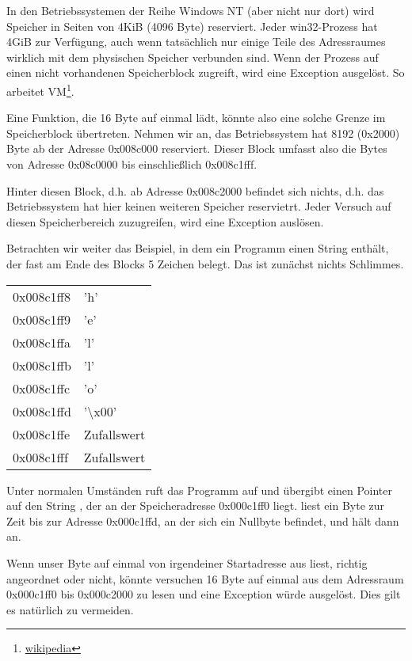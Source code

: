 \newcommand{\URLPAGE}{\href{http://go.yurichev.com/17136}{wikipedia}}
In den Betriebssystemen der Reihe \gls{Windows NT} (aber nicht nur dort) wird Speicher in Seiten von 4KiB (4096 Byte)
reserviert. Jeder win32-Prozess hat 4GiB zur Verfügung, auch wenn tatsächlich nur einige Teile des Adressraumes wirklich
mit dem physischen Speicher verbunden sind. Wenn der Prozess auf einen nicht vorhandenen Speicherblock zugreift, wird
eine Exception ausgelöst. So arbeitet \ac{VM}\footnote{\URLPAGE}.

Eine Funktion, die 16 Byte auf einmal lädt, könnte also eine solche Grenze im Speicherblock übertreten.
Nehmen wir an, das Betriebssystem hat 8192 (0x2000) Byte ab der Adresse 0x008c000 reserviert.
Dieser Block umfasst also die Bytes von Adresse 0x08c0000 bis einschließlich 0x008c1fff.

Hinter diesen Block, d.h. ab Adresse 0x008c2000 befindet sich nichts, d.h. das Betriebssystem hat hier keinen weiteren
Speicher reservietrt. Jeder Versuch auf diesen Speicherbereich zuzugreifen, wird eine Exception auslösen.

Betrachten wir weiter das Beispiel, in dem ein Programm einen String enthält, der fast am Ende des Blocks 5 Zeichen
belegt. Das ist zunächst nichts Schlimmes.
\begin{center}
  \begin{tabular}{ | l | l | }
    \hline
        0x008c1ff8 & 'h' \\
        0x008c1ff9 & 'e' \\
        0x008c1ffa & 'l' \\
        0x008c1ffb & 'l' \\
        0x008c1ffc & 'o' \\
        0x008c1ffd & '\textbackslash{}x00' \\
        0x008c1ffe & Zufallswert \\
        0x008c1fff & Zufallswert \\
    \hline
  \end{tabular}
\end{center}
Unter normalen Umständen ruft das Programm \strlen auf und übergibt einen Pointer auf den String , der an
der Speicheradresse 0x000c1ff0 liegt.
\strlen liest ein Byte zur Zeit bis zur Adresse 0x000c1ffd, an der sich ein Nullbyte befindet, und hält dann an.

Wenn unser  Byte auf einmal von irgendeiner Startadresse aus liest, richtig angeordnet oder nicht, könnte
\MOVDQU versuchen 16 Byte auf einmal aus dem Adressraum 0x000c1ff0 bis 0x000c2000 zu lesen und eine Exception würde
ausgelöst. Dies gilt es natürlich zu vermeiden.

